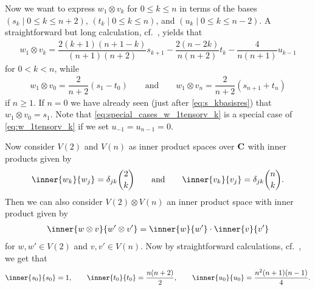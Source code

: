 Now we want to express $w_1\otimes v_k$ for $0\leq k\leq n$ in terms of the bases $(s_k \mid 0\leq k\leq n+2)$, $(t_k \mid 0\leq k\leq n)$, and $(u_k \mid 0\leq k\leq n-2)$. A straightforward but long calculation, cf.\ , yields that
\begin{align}\label{eq:w_1tensorv_k}
  w_1\otimes v_k = \dfrac{2(k+1)(n+1-k)}{(n+1)(n+2)}s_{k+1} - \dfrac{2(n-2k)}{n(n+2)}t_k - \dfrac{4}{n(n+1)}u_{k-1}
\end{align}
for $0<k<n$, while
\begin{align}\label{eq:special_cases_w_1tensorv_k}
  w_1\otimes v_0 = \dfrac{2}{n+2}(s_1-t_0) \qquad \mbox{and} \qquad w_1\otimes v_n = \dfrac{2}{n+2}(s_{n+1}+t_n)
\end{align}
if $n\geq 1$. If $n=0$ we have already seen (just after \cref{eq:s_kbasisres}) that $w_1\otimes v_0 = s_1$. Note that \cref{eq:special_cases_w_1tensorv_k} is a special case of \cref{eq:w_1tensorv_k} if we set $u_{-1}=u_{n-1}=0$.

Now consider $V(2)$ and $V(n)$ as inner product spaces over $\mathbf{C}$ with inner products given by
\begin{align}\label{eq:inproddef1}
  \inner{w_k}{w_j} = \delta_{jk} \binom{2}{k} \qquad \mbox{and} \qquad \inner{v_k}{v_j} = \delta_{jk}\binom{n}{k}.
\end{align}
Then we can also consider $V(2)\otimes V(n)$ an inner product space with inner product given by
\begin{align}\label{eq:inproddef2}
  \inner{w\otimes v}{w'\otimes v'} = \inner{w}{w'}\cdot\inner{v}{v'}
\end{align}
for $w,w'\in V(2)$ and $v,v'\in V(n)$. Now by straightforward calculations, cf.\ , we get that
\begin{align}\label{eq:inprodres}
  \inner{s_0}{s_0} = 1, \qquad \inner{t_0}{t_0} = \dfrac{n(n+2)}{2}, \qquad \inner{u_0}{u_0} = \dfrac{n^2(n+1)(n-1)}{4}.
\end{align}

